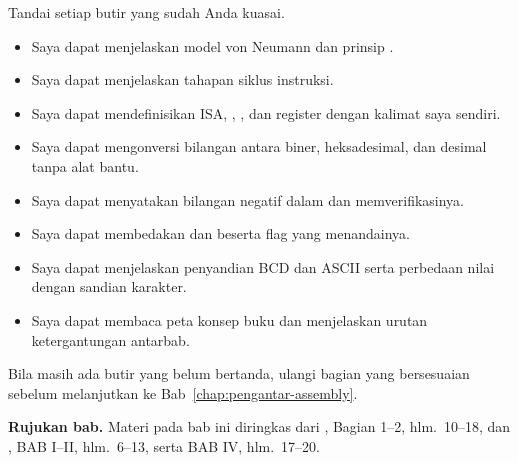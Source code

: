 \begin{checklistbox}
Tandai setiap butir yang sudah Anda kuasai.

\begin{itemize}
    \item[\checkbox] Saya dapat menjelaskan model von Neumann dan
          prinsip .
    \item[\checkbox] Saya dapat menjelaskan tahapan siklus instruksi.
    \item[\checkbox] Saya dapat mendefinisikan ISA, ,
          , dan register dengan kalimat saya sendiri.
    \item[\checkbox] Saya dapat mengonversi bilangan antara biner,
          heksadesimal, dan desimal tanpa alat bantu.
    \item[\checkbox] Saya dapat menyatakan bilangan negatif dalam
           dan memverifikasinya.
    \item[\checkbox] Saya dapat membedakan  dan
           beserta flag yang menandainya.
    \item[\checkbox] Saya dapat menjelaskan penyandian BCD dan ASCII
          serta perbedaan nilai dengan sandian karakter.
    \item[\checkbox] Saya dapat membaca peta konsep buku dan
          menjelaskan urutan ketergantungan antarbab.
\end{itemize}

\vspace{0.4em}
Bila masih ada butir yang belum bertanda, ulangi bagian yang
bersesuaian sebelum melanjutkan ke Bab~\ref{chap:pengantar-assembly}.
\end{checklistbox}

\begin{infobox}
\textbf{Rujukan bab.} Materi pada bab ini diringkas dari
\cite{gunawan2019}, Bagian 1--2, hlm.~10--18, dan \cite{sto2001},
BAB I--II, hlm.~6--13, serta BAB IV, hlm.~17--20.
\end{infobox}
